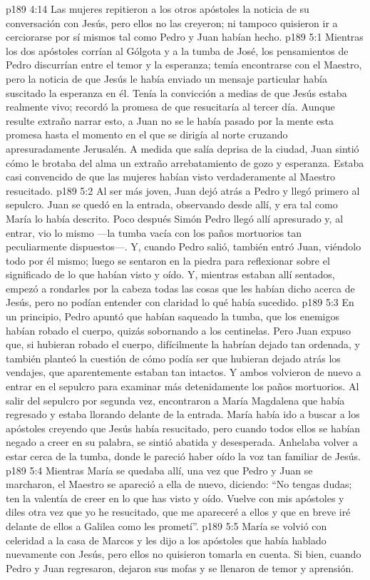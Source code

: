 \vs p189 4:14 Las mujeres repitieron a los otros apóstoles la noticia de su conversación con Jesús, pero ellos no las creyeron; ni tampoco quisieron ir a cerciorarse por sí mismos tal como Pedro y Juan habían hecho.
\vs p189 5:1 Mientras los dos apóstoles corrían al Gólgota y a la tumba de José, los pensamientos de Pedro discurrían entre el temor y la esperanza; temía encontrarse con el Maestro, pero la noticia de que Jesús le había enviado un mensaje particular había suscitado la esperanza en él. Tenía la convicción a medias de que Jesús estaba realmente vivo; recordó la promesa de que resucitaría al tercer día. Aunque resulte extraño narrar esto, a Juan no se le había pasado por la mente esta promesa hasta el momento en el que se dirigía al norte cruzando apresuradamente Jerusalén. A medida que salía deprisa de la ciudad, Juan sintió cómo le brotaba del alma un extraño arrebatamiento de gozo y esperanza. Estaba casi convencido de que las mujeres habían visto verdaderamente al Maestro resucitado.
\vs p189 5:2 Al ser más joven, Juan dejó atrás a Pedro y llegó primero al sepulcro. Juan se quedó en la entrada, observando desde allí, y era tal como María lo había descrito. Poco después Simón Pedro llegó allí apresurado y, al entrar, vio lo mismo ---la tumba vacía con los paños mortuorios tan peculiarmente dispuestos---. Y, cuando Pedro salió, también entró Juan, viéndolo todo por él mismo; luego se sentaron en la piedra para reflexionar sobre el significado de lo que habían visto y oído. Y, mientras estaban allí sentados, empezó a rondarles por la cabeza todas las cosas que les habían dicho acerca de Jesús, pero no podían entender con claridad lo qué había sucedido.
\vs p189 5:3 En un principio, Pedro apuntó que habían saqueado la tumba, que los enemigos habían robado el cuerpo, quizás sobornando a los centinelas. Pero Juan expuso que, si hubieran robado el cuerpo, difícilmente la habrían dejado tan ordenada, y también planteó la cuestión de cómo podía ser que hubieran dejado atrás los vendajes, que aparentemente estaban tan intactos. Y ambos volvieron de nuevo a entrar en el sepulcro para examinar más detenidamente los paños mortuorios. Al salir del sepulcro por segunda vez, encontraron a María Magdalena que había regresado y estaba llorando delante de la entrada. María había ido a buscar a los apóstoles creyendo que Jesús había resucitado, pero cuando todos ellos se habían negado a creer en su palabra, se sintió abatida y desesperada. Anhelaba volver a estar cerca de la tumba, donde le pareció haber oído la voz tan familiar de Jesús.
\vs p189 5:4 Mientras María se quedaba allí, una vez que Pedro y Juan se marcharon, el Maestro se apareció a ella de nuevo, diciendo: “No tengas dudas; ten la valentía de creer en lo que has visto y oído. Vuelve con mis apóstoles y diles otra vez que yo he resucitado, que me apareceré a ellos y que en breve iré delante de ellos a Galilea como les prometí”.
\vs p189 5:5 María se volvió con celeridad a la casa de Marcos y les dijo a los apóstoles que había hablado nuevamente con Jesús, pero ellos no quisieron tomarla en cuenta. Si bien, cuando Pedro y Juan regresaron, dejaron sus mofas y se llenaron de temor y aprensión.
